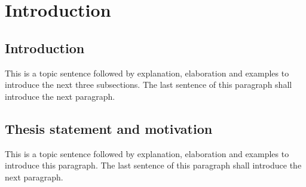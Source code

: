 \chapter{Introduction}
\label{ch:introduction}

\section{Introduction}
\label{sec:ch_1_introduction}

This is a topic sentence followed by explanation, elaboration and examples to introduce the next three subsections. The last sentence of this paragraph shall introduce the next paragraph.

\section{Thesis statement and motivation}
\label{sec:ch_1_firstmain}

This is a topic sentence followed by explanation, elaboration and examples to introduce this paragraph. The last sentence of this paragraph shall introduce the next paragraph.
